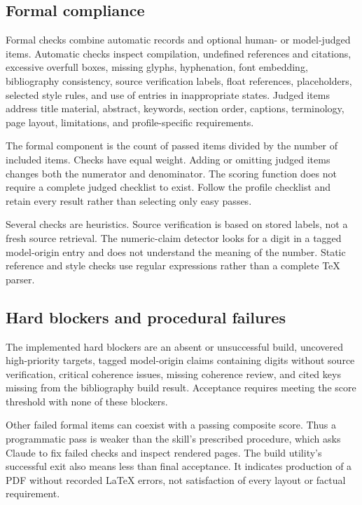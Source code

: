\documentclass[12pt,a4paper]{article}
\begin{document}
\subsection{Formal compliance}
Formal checks combine automatic records and optional human- or model-judged items. Automatic checks inspect compilation, undefined references and citations, excessive overfull boxes, missing glyphs, hyphenation, font embedding, bibliography consistency, source verification labels, float references, placeholders, selected style rules, and use of entries in inappropriate states. Judged items address title material, abstract, keywords, section order, captions, terminology, page layout, limitations, and profile-specific requirements.

The formal component is the count of passed items divided by the number of included items. Checks have equal weight. Adding or omitting judged items changes both the numerator and denominator. The scoring function does not require a complete judged checklist to exist. Follow the profile checklist and retain every result rather than selecting only easy passes.

Several checks are heuristics. Source verification is based on stored labels, not a fresh source retrieval. The numeric-claim detector looks for a digit in a tagged model-origin entry and does not understand the meaning of the number. Static reference and style checks use regular expressions rather than a complete TeX parser.

\subsection{Hard blockers and procedural failures}
The implemented hard blockers are an absent or unsuccessful build, uncovered high-priority targets, tagged model-origin claims containing digits without source verification, critical coherence issues, missing coherence review, and cited keys missing from the bibliography build result. Acceptance requires meeting the score threshold with none of these blockers.

Other failed formal items can coexist with a passing composite score. Thus a programmatic pass is weaker than the skill's prescribed procedure, which asks Claude to fix failed checks and inspect rendered pages. The build utility's successful exit also means less than final acceptance. It indicates production of a PDF without recorded LaTeX errors, not satisfaction of every layout or factual requirement.
\end{document}
